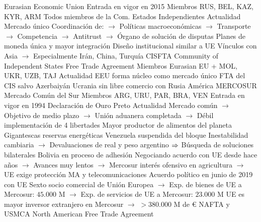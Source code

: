 \documentclass{nuevotema}
\begin{document}
\begin{esquemal}
			\3 Eurasian Economic Union
				\4 Entrada en vigor en 2015
				\4 Miembros
				\4[] RUS, BEL, KAZ, KYR, ARM
				\4[] Todos miembros de la Com. Estados Independientes
				\4 Actualidad
				\4[] Mercado único
				\4[] Coordinación de:
				\4[] $\to$ Políticas macroeconómicas
				\4[] $\to$ Transporte
				\4[] $\to$ Competencia
				\4[] $\to$ Antitrust
				\4[] $\to$ Órgano de solución de disputas
				\4[] Planes de moneda única y mayor integración
				\4[] Diseño institucional similar a UE
				\4[] Vínculos con Asia
				\4[] $\to$ Especialmente Irán, China, Turquía
			\3 CISFTA
				\4 Community of Independent States Free Trade Agreement
				\4 Miembros
				\4[] Eurasian EU + MOL, UKR, UZB, TAJ
				\4 Actualidad
				\4[] EEU forma núcleo como mercado único
				\4[] FTA del CIS salvo Azerbaiyán
				\4[] Ucrania sin libre comercio con Rusia
		\2 América
			\3 MERCOSUR
				\4 Mercado Común del Sur
				\4 Miembros
				\4[] ARG, URU, PAR, BRA, VEN
				\4 Entrada en vigor en 1994
				\4[] Declaración de Ouro Preto
				\4 Actualidad
				\4[] Mercado común
				\4[] $\to$ Objetivo de medio plazo
				\4[] $\to$ Unión aduanera completada
				\4[] $\to$ Débil implementación de 4 libertades
				\4[] Mayor productor de alimentos del planeta
				\4[] Gigantescas reservas energéticas
				\4[] Venezuela suspendida del bloque
				\4[] Inestabilidad cambiaria
				\4[] $\to$ Devaluaciones de real y peso argentino
				\4[] $\Rightarrow$ Búsqueda de soluciones bilaterales
				\4[] Bolivia en proceso de adhesión
				\4[] Negociando acuerdo con UE desde hace años
				\4[] $\to$ Avances muy lentos
				\4[] $\to$ Mercosur interés ofensivo en agricultura
				\4[] $\to$ UE exige protección MA y telecomunicaciones
				\4[] Acuerdo político en junio de 2019 con UE
				\4[] Sexto socio comercial de Unión Europea
				\4[] $\to$ Exp. de bienes de UE a Mercosur: $45.000$ M
				\4[] $\to$ Exp. de servicios de UE a Mercosur: $23.000$ M
				\4[] UE es mayor inversor extranjero en Mercosur
				\4[] $\to$ $>380.000$ M de €
			\3 NAFTA y USMCA
				\4 North American Free Trade Agreement


\end{esquemal}
\end{document}
